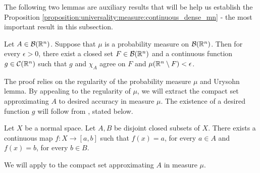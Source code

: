 The following two lemmas are auxiliary results that will be help us establish the Proposition \ref{proposition:universality:measure:continuous_dense_mn} - the most important result in this subsection.
\begin{lemma}
\label{lemma:universality:measure:uap:approx_characteristic}
Let $A \in {\mathcal B}({\mathbb R}^n)$. Suppose that $\mu$ is a probability measure on ${\mathcal B}({\mathbb R}^n)$. Then for every $\epsilon > 0$, there exist a closed set $F \in {\mathcal B}({\mathbb R}^n)$ and a continuous function $g \in {\mathcal C}({\mathbb R}^n)$ such that $g$ and $\chi_A$ agree on $F$ and $\mu ({\mathbb R}^n \setminus F) < \epsilon$.
\end{lemma}
\begin{proof-idea*}
The proof relies on the regularity of the probability measure $\mu$ and Urysohn lemma. By appealing to the regularity of $\mu$, we will extract the compact set approximating $A$ to desired accuracy in measure $\mu$. The existence of a desired function $g$ will follow from , stated below.
\begin{lemma*}
\label{lemma:topology:urysohn}
Let $X$ be a normal space. Let $A, B$ be disjoint closed subsets of $X$. There exists a continuous map $f : X \to [a,b]$ such that $f(x) = a$, for every $a \in A$ and $f(x) = b$, for every $b \in B$.
\end{lemma*}
We will apply  to the compact set approximating $A$ in measure $\mu$.
\end{proof-idea*}
\pagebreak
